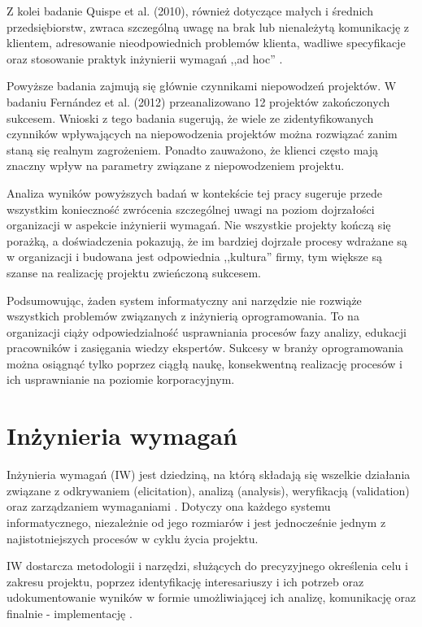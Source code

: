     Z kolei badanie Quispe et al. (2010), również dotyczące małych i średnich przedsiębiorstw, zwraca szczególną uwagę na brak lub nienależytą komunikację z klientem, adresowanie nieodpowiednich problemów klienta, wadliwe specyfikacje oraz stosowanie praktyk inżynierii wymagań ,,ad hoc'' \cite{Quispe10}.
    
    Powyższe badania zajmują się głównie czynnikami niepowodzeń projektów. W badaniu Fern\'{a}ndez et al. (2012) przeanalizowano 12 projektów zakończonych sukcesem. Wnioski z tego badania sugerują, że wiele ze zidentyfikowanych czynników wpływających na niepowodzenia projektów można rozwiązać zanim staną się realnym zagrożeniem. Ponadto zauważono, że klienci często mają znaczny wpływ na parametry związane z niepowodzeniem projektu. 

    Analiza wyników powyższych badań w kontekście tej pracy sugeruje przede wszystkim konieczność zwrócenia szczególnej uwagi na poziom dojrzałości organizacji w aspekcie inżynierii wymagań. Nie wszystkie projekty kończą się porażką, a doświadczenia pokazują, że im bardziej dojrzałe procesy wdrażane są w organizacji i budowana jest odpowiednia ,,kultura'' firmy, tym większe są szanse na realizację projektu zwieńczoną sukcesem. 

    Podsumowując, żaden system informatyczny ani narzędzie nie rozwiąże wszystkich problemów związanych z inżynierią oprogramowania. To na organizacji ciąży odpowiedzialność usprawniania procesów fazy analizy, edukacji pracowników i zasięgania wiedzy ekspertów. Sukcesy w branży oprogramowania można osiągnąć tylko poprzez ciągłą naukę, konsekwentną realizację procesów i ich usprawnianie na poziomie korporacyjnym.

  \section{Inżynieria wymagań}
    
    Inżynieria wymagań (IW) jest dziedziną, na którą składają się wszelkie działania związane z odkrywaniem (elicitation), analizą (analysis), weryfikacją (validation) oraz zarządzaniem wymaganiami \cite{Somm06}. Dotyczy ona każdego systemu informatycznego, niezależnie od jego rozmiarów i jest jednocześnie jednym z najistotniejszych procesów w cyklu życia projektu.

    IW dostarcza metodologii i narzędzi, służących do precyzyjnego określenia celu i zakresu projektu, poprzez identyfikację interesariuszy i ich potrzeb oraz udokumentowanie wyników w formie umożliwiającej ich analizę, komunikację oraz finalnie - implementację \cite{Nus00}. 

